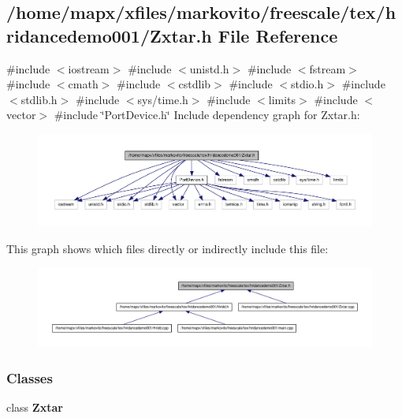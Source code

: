 \subsection{/home/mapx/xfiles/markovito/freescale/tex/hridancedemo001/\-Zxtar.h \-File \-Reference}
\label{_zxtar_8h}
{\ttfamily \#include $<$iostream$>$}\*
{\ttfamily \#include $<$unistd.\-h$>$}\*
{\ttfamily \#include $<$fstream$>$}\*
{\ttfamily \#include $<$cmath$>$}\*
{\ttfamily \#include $<$cstdlib$>$}\*
{\ttfamily \#include $<$stdio.\-h$>$}\*
{\ttfamily \#include $<$stdlib.\-h$>$}\*
{\ttfamily \#include $<$sys/time.\-h$>$}\*
{\ttfamily \#include $<$limits$>$}\*
{\ttfamily \#include $<$vector$>$}\*
{\ttfamily \#include \char`\"{}\-Port\-Device.\-h\char`\"{}}\*
\-Include dependency graph for \-Zxtar.\-h\-:\nopagebreak
\begin{figure}[H]
\begin{center}
\leavevmode
\includegraphics[width=350pt]{_zxtar_8h__incl}
\end{center}
\end{figure}
\-This graph shows which files directly or indirectly include this file\-:\nopagebreak
\begin{figure}[H]
\begin{center}
\leavevmode
\includegraphics[width=350pt]{_zxtar_8h__dep__incl}
\end{center}
\end{figure}
\subsubsection*{\-Classes}
\begin{DoxyCompactItemize}
\item 
class {\bf \-Zxtar}
\end{DoxyCompactItemize}
